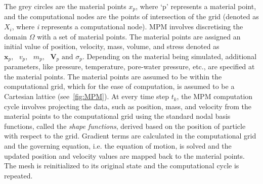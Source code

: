 The grey circles are the material points $x_{p}$, where `p' represents 
a material point, and the computational nodes are the points of intersection of 
the grid (denoted as $X_{i}$, where \textit{i} represents a computational 
node). MPM involves discretising the domain $\Omega$ with 
a set of material points. The material points are assigned an initial value of 
position, velocity, mass, volume, and stress denoted as $\mathbf{x}_{p},\mbox{  
} \mathbf{\mathit{v}}_{p},\mbox{  } \mathit{m}_{p}, \mbox{  
}\mathbf{V}_{p}\mbox{ and }\sigma_{p} $. Depending on the material being 
simulated, additional parameters, like pressure, temperature, pore-water 
pressure, etc., are specified at the material points. The material points are 
assumed to be within the computational grid, which for the ease of computation, 
is assumed to be a Cartesian lattice (see~\cref{fig:MPM}). At 
every time step $\mathit{t}_{k}$, the MPM computation cycle involves projecting 
the data, such as position, mass, and velocity from the material points to the 
computational grid using the standard nodal basis functions, called the 
\textit{shape functions}, derived based on the position of particle with 
respect to the grid. Gradient terms are calculated in the computational grid 
and the governing equation, i.e. the equation of motion, is solved and the 
updated position and velocity values are mapped back to the material points. 
The mesh is reinitialized to its original state and the computational cycle is 
repeated. 

